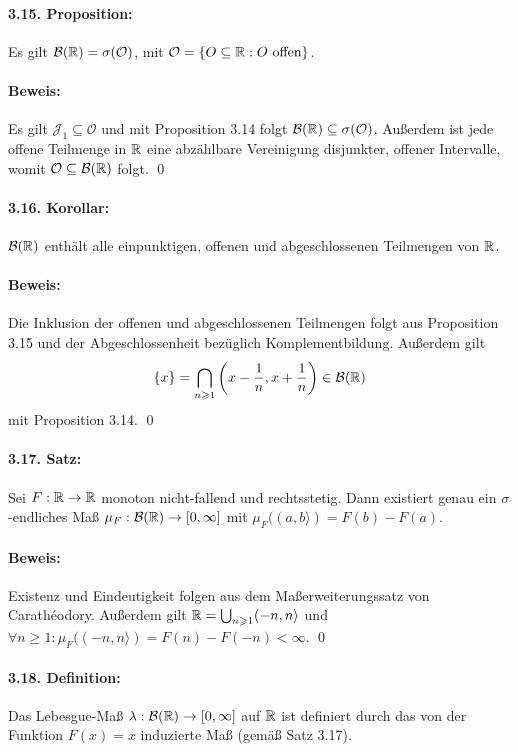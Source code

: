 \paragraph{3.15. Proposition:}Es gilt $\mathcal{B}(\mathbb{R})=\sigma(\mathcal{O})$, mit $\mathcal{O}=\{O\subseteq\mathbb{R}:O\text{ offen}\}$.

\paragraph{Beweis:} Es gilt $\mathcal{J}_1\subseteq\mathcal{O}$ und mit Proposition 3.14 folgt $\mathcal{B}(\mathbb{R})\subseteq\sigma(\mathcal{O})$. Au\ss{}erdem ist jede offene Teilmenge in $\mathbb{R}$ eine abz\"ahlbare Vereinigung disjunkter, offener Intervalle, womit $\mathcal{O}\subseteq\mathcal{B}(\mathbb{R})$ folgt. \qed 

\paragraph{3.16. Korollar:}$\mathcal{B}(\mathbb{R})$ enth\"alt alle einpunktigen, offenen und abgeschlossenen Teilmengen von $\mathbb{R}$.

\paragraph{Beweis:}Die Inklusion der offenen und abgeschlossenen Teilmengen folgt aus Proposition 3.15 und der Abgeschlossenheit bez\"uglich Komplementbildung. \newline
Au\ss{}erdem gilt 
$$\{x\}=\bigcap_{n\geqslant1}\left(x-\frac{1}{n},x+\frac{1}{n}\right)\in\mathcal{B}(\mathbb{R})$$
mit Proposition 3.14. \qed

\paragraph{3.17. Satz:}Sei $F:\mathbb{R}\to\mathbb{R}$ monoton nicht-fallend und rechtsstetig. Dann existiert genau ein $\sigma$-endliches Ma\ss{} $\mu_F:\mathcal{B}(\mathbb{R})\to[0,\infty]$ mit $\mu_F((a,b\rangle)=F(b)-F(a)$.

\paragraph{Beweis:}Existenz und Eindeutigkeit folgen aus dem Ma\ss{}erweiterungssatz von Carath\'eodory. Au\ss{}erdem gilt $\mathbb{R}=\bigcup_{n\geqslant1}(-n,n\rangle$ und $\forall n\geq1:\mu_F((-n,n\rangle)=F(n)-F(-n)<\infty$. \qed

\paragraph{3.18. Definition:}Das Lebesgue-Ma\ss{} $\lambda:\mathcal{B}(\mathbb{R})\to[0,\infty]$ auf $\mathbb{R}$ ist definiert durch das von der Funktion $F(x)=x$ induzierte Ma\ss{} (gem\"a\ss{} Satz 3.17).

